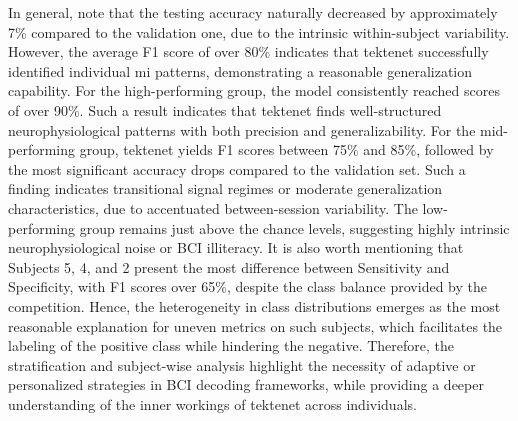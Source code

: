 In general, note that the testing accuracy naturally decreased by approximately 7\% compared to the validation one, due to the intrinsic within-subject variability. However, the average F1 score of over 80\% indicates that \gls{tektenet} successfully identified individual \gls{mi} patterns, demonstrating a reasonable generalization capability. For the high-performing group, the model consistently reached scores of over 90\%. Such a result indicates that \gls{tektenet} finds well-structured neurophysiological patterns with both precision and generalizability. For the mid-performing group, \gls{tektenet} yields F1 scores between 75\% and 85\%, followed by the most significant accuracy drops compared to the validation set. Such a finding indicates transitional signal regimes or moderate generalization characteristics, due to accentuated between-session variability. The low-performing group remains just above the chance levels, suggesting highly intrinsic neurophysiological noise or BCI illiteracy. It is also worth mentioning that Subjects 5, 4, and 2 present the most difference between Sensitivity and Specificity, with F1 scores over  65\%, despite the class balance provided by the competition. Hence, the heterogeneity in class distributions emerges as the most reasonable explanation for uneven metrics on such subjects, which facilitates the labeling of the positive class while hindering the negative. Therefore, the stratification and subject-wise analysis highlight the necessity of adaptive or personalized strategies in BCI decoding frameworks, while providing a deeper understanding of the inner workings of \gls{tektenet} across individuals. 
